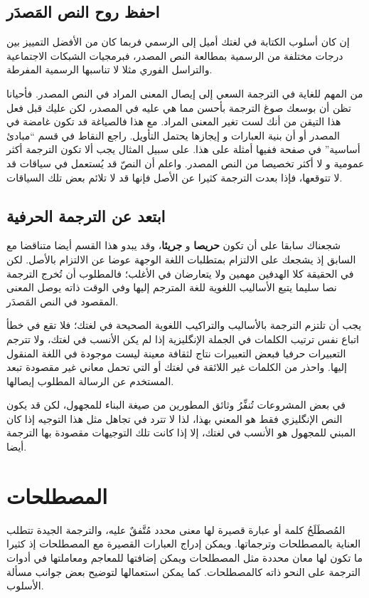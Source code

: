 \section{احفظ روح النص المَصدَر}
إن كان أسلوب الكتابة في لغتك أميل إلى الرسمي فربما كان من الأفضل التمييز
بين درجات مختلفة من الرسمية بمطالعة النص المصدر، فبرمجيات الشبكات
الاجتماعية والتراسل الفوري مثلا لا تناسبها الرسمية المفرطة.

من المهم للغاية في الترجمة السعي إلى إيصال المعنى المراد في النص المصدر.
فأحيانا تظن أن بوسعك صوغ الترجمة بأحسن مما هي عليه في المصدر، لكن عليك
قبل فعل هذا التيقن من أنك لست تغير المعنى المراد. مع هذا فالصياغة قد
تكون غامضة في المصدر أو أن بنية العبارات و إيجازها يحتمل التأويل. راجع
النقاط في قسم “مبادئ أساسية” في صفحة  ففيها
أمثلة على هذا. على سبيل المثال يجب ألا تكون الترجمة أكثر عمومية و لا
أكثر تخصيصا من النص المصدر. واعلم أن النصّ قد يُستعمل في سياقات قد لا
تتوقعها، فإذا بعدت الترجمة كثيرا عن الأصل فإنها قد لا تلائم بعض تلك
السياقات.

\section{ابتعد عن الترجمة الحرفية}
شجعناك سابقا على أن تكون {\bf حريصا} و {\bf جريئا}، وقد يبدو هذا القسم
أيضا متناقضا مع السابق إذ يشجعك على الالتزام بمتطلبات اللغة الوجهة عوضا
عن الالتزام بالأصل. لكن في الحقيقة كلا الهدفين مهمين ولا يتعارضان في
الأغلب؛ فالمطلوب أن تُخرج الترجمة نصا سليما يتبع الأساليب اللغوية للغة
المترجم إليها وفي الوقت ذاته يوصل المعنى المقصود في النص المَصدَر.

يجب أن تلتزم الترجمة بالأساليب والتراكيب اللغوية الصحيحة في لغتك؛ فلا
تقع في خطأ اتباع نفس ترتيب الكلمات في الجملة الإنگليزية إذا لم يكن
الأنسب في لغتك، ولا تترجم التعبيرات حرفيا فبعض التعبيرات نتاج لثقافة
معينة ليست موجودة في اللغة المنقول إليها. واحذر من الكلمات غير اللائقة
في لغتك أو التي تحمل معاني غير مقصودة تبعد المستخدم عن الرسالة المطلوب
إيصالها.

في بعض المشروعات تُنفِّرُ وثائق المطورين من صيغة البناء للمجهول، لكن قد
يكون النص الإنگليزي فقط هو المعني بهذا، لذا لا تترد في تجاهل مثل هذا
التوجيه إذا كان المبني للمجهول هو الأنسب في لغتك، إلا إذا كانت تلك
التوجيهات مقصودة بها الترجمة أيضا.

\chapter{المصطلحات}
المُصطَلَحُ كلمة أو عبارة قصيرة لها معنى محدد مُتَّفقٌ عليه، والترجمة
الجيدة تتطلب العناية بالمصطلحات وترجماتها. ويمكن إدراج العبارات القصيرة
مع المصطلحات إذ كثيرا ما تكون لها معان محددة مثل المصطلحات ويمكن
إضافتها للمعاجم ومعاملتها في أدوات الترجمة على النحو ذاته كالمصطلحات.
كما يمكن استعمالها لتوضيح بعض جوانب مسألة الأسلوب.

